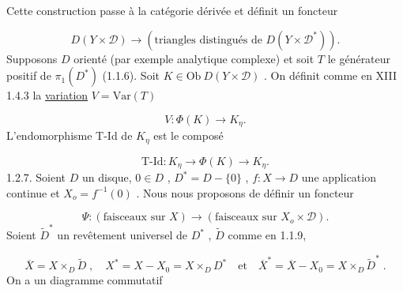 \begin{center}
\end{center}
Cette construction passe à la catégorie dérivée et définit un foncteur

\begin{equation*}
D(Y \times \mathcal{D}) \longrightarrow (\text{triangles distingués de } D(Y \times \mathcal{D}^*)) .
\end{equation*}
Supposons $D$ orienté (par exemple analytique complexe) et soit $T$ le générateur positif de $\pi_1(D^*)$ (1.1.6). Soit $K \in \mathrm{Ob}\ D(Y \times \mathcal{D})$ . On définit comme en XIII 1.4.3 la \underline{variation} $V = \mathrm{Var}(T)$

\begin{equation*}
V : \Phi(K) \longrightarrow K_\eta .
\end{equation*}
L'endomorphisme T-Id de $K_\eta$ est le composé

\begin{equation*}
\text{T-Id} : K_\eta \longrightarrow \Phi(K) \longrightarrow K_\eta .
\end{equation*}
1.2.7. Soient $D$ un disque, $0 \in D$ , $D^* = D-\{0\}$ , $f : X \to D$ une application continue et $X_o = f^{-1}(0)$ . Nous nous proposons de définir un foncteur

\begin{equation*}
\Psi : (\text{faisceaux sur } X ) \longrightarrow (\text{faisceaux sur } X_o \times \mathcal{D}) .
\end{equation*}
Soient $\widetilde{D}^*$ un revêtement universel de $D^*$ , $\widetilde{D}$ comme en 1.1.9, 



\begin{equation*}
 \overline{X} = X \times_D \widetilde{D} \; , \quad X^* = X-X_0 = X \times_D D^* \quad \mbox{et} \quad \overline{X}^* = \overline{X} - X_0 = X \times_D \widetilde{D}^* \; .
\end{equation*}
On a un diagramme commutatif

